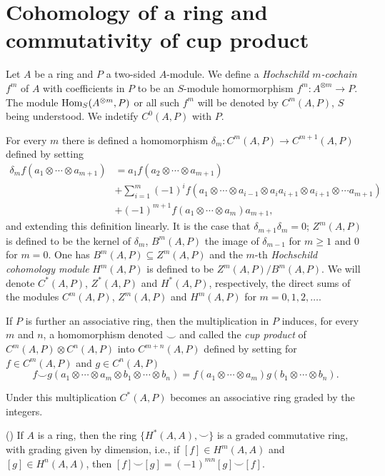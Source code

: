 \documentclass[TFM.tex]{subfiles}
\begin{document}
\section{Cohomology of a ring and commutativity of cup product}

\begin{defi}Let $A$ be a ring and $P$ a two-sided $A$-module. We define a \emph{Hochschild $m$-cochain} $f^m$ of $A$ with coefficients in $P$ to be an $S$-module homormorphism $f^m: A^{\otimes m}\to P$. The module $\operatorname{Hom}_S(A^{\otimes m}, P)$ or all such $f^m$ will be denoted by $C^m(A,P)$, $S$ being understood. We indetify $C^0(A,P)$ with $P$.
\end{defi}

For every $m$ there is defined a homomorphism $\delta_m: C^m(A,P)\to C^{m+1}(A,P)$ defined by setting
\begin{align*}
\delta_m f(a_1\otimes\cdots\otimes a_{m+1})&=a_1f(a_2\otimes\cdots\otimes a_{m+1})\\
& +\sum_{i=1}^m(-1)^if(a_1\otimes\cdots\otimes a_{i-1}\otimes a_ia_{i+1}\otimes a_{i+1}\otimes\cdots a_{m+1})\\
& +(-1)^{m+1}f(a_1\otimes\cdots\otimes a_m)a_{m+1},
\end{align*}
and extending this definition linearly. It is the case that $\delta_{m+1}\delta_m=0$; $Z^m(A,P)$ is defined to be the kernel of $\delta_m$, $B^m(A,P)$ the image of $\delta_{m-1}$ for $m\geq 1$ and 0 for $m=0$. One has $B^m(A,P)\subseteq Z^m(A,P)$ and the $m$-th \emph{Hochschild cohomology module} $H^m(A,P)$ is defined to be $Z^m(A,P)/B^m(A,P)$. We will denote $C^*(A,P)$, $Z^*(A,P)$ and $H^*(A,P)$, respectively, the direct sums of the modules $C^m(A,P)$, $Z^m(A,P)$ and $H^m(A,P)$ for $m=0,1,2,\dots$. 

If $P$ is further an associative ring, then the multiplication in $P$ induces, for every $m$ and $n$, a homomorphism denoted $\smile$ and called the \emph{cup product} of $C^m(A,P)\otimes C^n(A,P)$ into $C^{m+n}(A,P)$ defined by setting for $f\in C^m(A,P)$ and $g\in C^n(A,P)$
\[
f\smile g(a_1\otimes\cdots\otimes a_m\otimes b_1\otimes\cdots\otimes b_n)=f(a_1\otimes\cdots\otimes a_m)g(b_1\otimes\cdots\otimes b_n).
\]

Under this multiplication $C^*(A,P)$ becomes an associative ring graded by the integers.

\begin{thm}(\cite[Corollary 1 of ]{Gerstenhaber})
If $A$ is a ring, then the ring $\{H^*(A,A),\smile\}$ is a graded commutative ring, with grading given by dimension, i.e., if $[f]\in H^m(A,A)$ and $[g]\in H^n(A,A)$, then $[f]\smile [g] =(-1)^{mn}[g]\smile [f]$.
\end{thm} 
\end{document}
